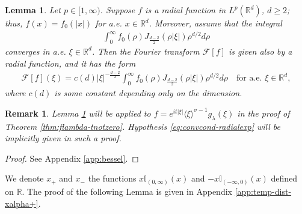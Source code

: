 \documentclass[a4paper, reqno, 11pt]{amsart}
\newtheorem{lemma}[theorem]{Lemma}
\newtheorem{remark}[theorem]{Remark}
\theoremstyle{definition}
\begin{document}
\begin{lemma}\label{lemma:ftransformradial_bessel}
		Let $p \in [1,\infty)$. Suppose $f$ is a radial function in  $L^p(\mathbb{R}^d)$, $d \geq 2$; thus, $f(x) = f_0(|x|)$ for a.e. $x \in \mathbb{R}^d$. Moreover, assume that the integral
\begin{align}\label{eq:convcond-radialexp}
\int_0^{\infty} f_0(\rho) J_{\frac{d-2}{2}}(\rho|\xi|) \rho^{d/2} d\rho
\end{align}		
converges in a.e. $\xi \in \mathbb{R}^d$. Then the Fourier transform $\mathcal{F}[f]$ is given also by a radial function, and it has the form
		\begin{align*}
			\mathcal{F}[f](\xi) = c(d) |\xi|^{-\frac{d-2}{2}} \int_0^{\infty} f_0(\rho) J_{\frac{d-2}{2}}(\rho|\xi|) \rho^{d/2} d\rho \quad \text{for a.e. } \xi \in \mathbb{R}^d,
		\end{align*}
		where $c(d)$ is some constant depending only on the dimension.
	\end{lemma}
	\begin{remark}
	Lemma \ref{lemma:ftransformradial_bessel} will be applied to $f = e^{it|\xi|} \langle \xi \rangle^{\sigma-1} g_{\lambda}(\xi)$ in the proof of Theorem \ref{thm:flambda-tnotzero}. Hypothesis \eqref{eq:convcond-radialexp} will be implicitly given in such a proof.
	\end{remark}
	\begin{proof}
	See Appendix \ref{app:bessel}.
	\end{proof}

We denote $x_+$ and $x_-$ the functions $x \mathbb{I}_{(0,\infty)}(x)$ and $-x \mathbb{I}_{(-\infty,0)}(x)$ defined on $\mathbb{R}$. The proof of the following Lemma is given in Appendix \ref{app:temp-dist-xalpha+}.
	
\end{document}
